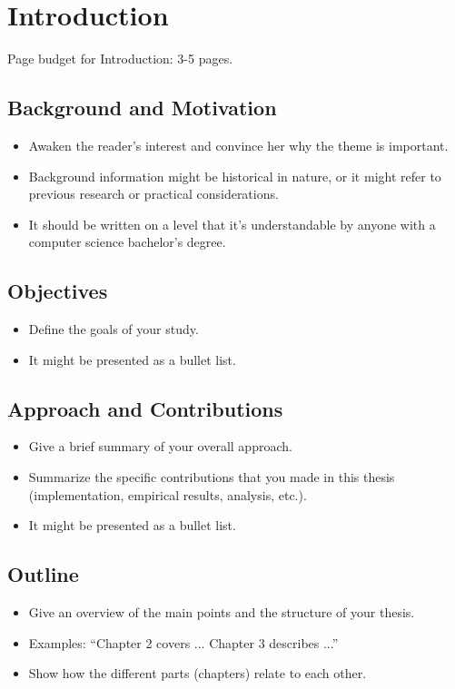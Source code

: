 
\chapter{Introduction}
\label{ch:intro}

Page budget for Introduction: 3-5 pages.


\section{Background and Motivation}
\label{sec:motivation}

\begin{itemize}
\item Awaken the reader's interest and convince her why the theme is important.
\item Background information might be historical in nature, or it might refer to previous research or practical considerations.
\item It should be written on a level that it's understandable by anyone with a computer science bachelor's degree.
\end{itemize}


\section{Objectives}

\begin{itemize}
\item Define the goals of your study. 
\item It might be presented as a bullet list.
\end{itemize}


\section{Approach and Contributions}

\begin{itemize}
\item Give a brief summary of your overall approach.
\item Summarize the specific contributions that you made in this thesis (implementation, empirical results, analysis, etc.).
\item It might be presented as a bullet list.
\end{itemize}


\section{Outline}

\begin{itemize}
\item Give an overview of the main points and the structure of your thesis.
\item Examples: ``Chapter 2 covers ...  Chapter 3 describes ...''
\item Show how the different parts (chapters) relate to each other.
\end{itemize}
